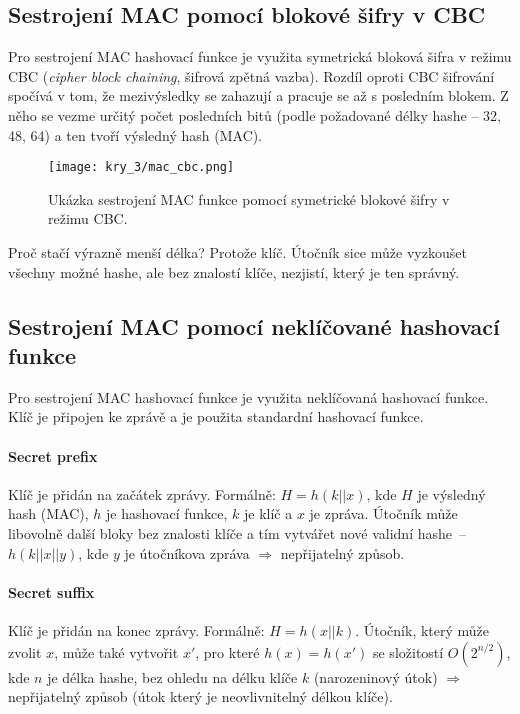 \subsection*{Sestrojení MAC pomocí blokové šifry v CBC}

Pro sestrojení MAC hashovací funkce je využita symetrická bloková šifra v režimu CBC (\textit{cipher block chaining}, šifrová zpětná vazba). Rozdíl oproti CBC šifrování spočívá v tom, že mezivýsledky se zahazují a pracuje se až s posledním blokem. Z něho se vezme určitý počet posledních bitů (podle požadované délky hashe -- 32, 48, 64) a ten tvoří výsledný hash (MAC).

\begin{figure}[H]
    \centering
    \texttt{[image: kry\_3/mac\_cbc.png]}
    \caption{Ukázka sestrojení MAC funkce pomocí symetrické blokové šifry v režimu CBC.}
\end{figure}

Proč stačí výrazně menší délka? Protože klíč. Útočník sice může vyzkoušet všechny možné hashe, ale bez znalostí klíče, nezjistí, který je ten správný.

\subsection*{Sestrojení MAC pomocí neklíčované hashovací funkce}

Pro sestrojení MAC hashovací funkce je využita neklíčovaná hashovací funkce. Klíč je připojen ke zprávě a je použita standardní hashovací funkce.

\paragraph*{Secret prefix} Klíč je přidán na začátek zprávy. Formálně: $H = h(k || x)$, kde $H$ je výsledný hash (MAC), $h$ je hashovací funkce, $k$ je klíč a $x$ je zpráva. Útočník může libovolně  další bloky bez znalosti klíče a tím vytvářet nové validní hashe~--~$h(k || x || y)$, kde $y$ je útočníkova zpráva $\Rightarrow$ nepřijatelný způsob.

\paragraph*{Secret suffix} Klíč je přidán na konec zprávy. Formálně: $H = h(x || k)$. Útočník, který může zvolit $x$, může také vytvořit $x'$, pro které $h(x) = h(x')$ se složitostí $O(2^{n/2})$, kde $n$ je délka hashe, bez ohledu na délku klíče $k$ (narozeninový útok) $\Rightarrow$ nepřijatelný způsob (útok který je neovlivnitelný délkou klíče).

